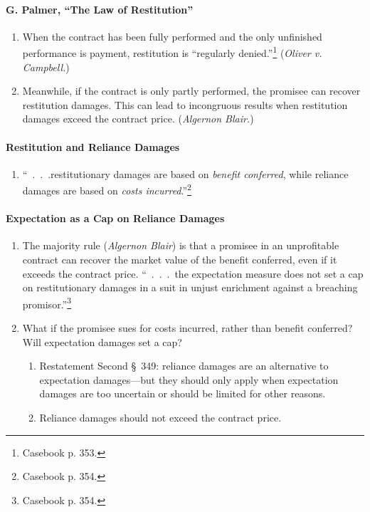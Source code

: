 \paragraph{G. Palmer, ``The Law of Restitution''}

\begin{enumerate}
    \item When the contract has been fully performed and the only unfinished 
    performance is payment, restitution is ``regularly 
    denied.''\footnote{Casebook p. 353.} (\emph{Oliver v. Campbell.})
    \item Meanwhile, if the contract is only partly performed, the promisee 
    can recover restitution damages. This can lead to incongruous results when 
    restitution damages exceed the contract price. (\emph{Algernon Blair.})
\end{enumerate}

\paragraph{Restitution and Reliance Damages}

\begin{enumerate}
    \item ``~.~.~.restitutionary damages are based on \emph{benefit 
    conferred}, while reliance damages are based on \emph{costs 
    incurred}.''\footnote{Casebook p. 354.}
\end{enumerate}

\paragraph{Expectation as a Cap on Reliance Damages}

\begin{enumerate}
    \item The majority rule (\emph{Algernon Blair}) is that a promisee in an 
    unprofitable contract can recover the market value of the benefit 
    conferred, even if it exceeds the contract price. ``~.~.~.~the expectation 
    measure does not set a cap on restitutionary damages in a suit in unjust 
    enrichment against a breaching promisor.''\footnote{Casebook p. 354.}
    \item What if the promisee sues for costs incurred, rather than benefit 
    conferred? Will expectation damages set a cap?
    \begin{enumerate}
        \item Restatement Second \S\ 349: reliance damages are an alternative 
        to expectation damages---but they should only apply when expectation 
        damages are too uncertain or should be limited for other reasons.
        \item Reliance damages should not exceed the contract price.
    \end{enumerate}
\end{enumerate}

